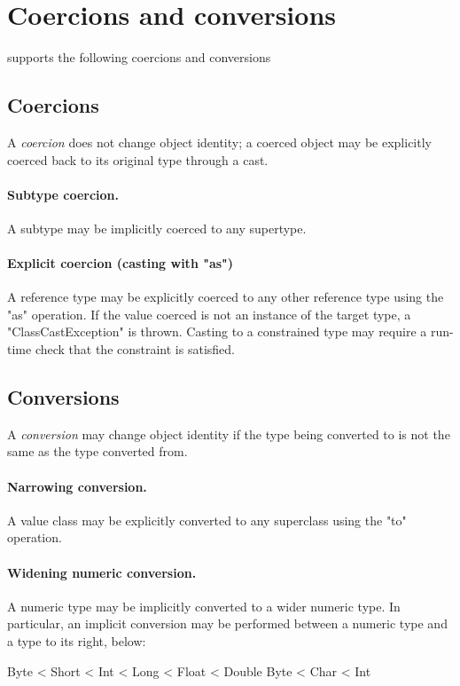 \section{Coercions and conversions}
\label{XtenConversions}\label{XtenPromotions}

\XtenCurrVer{} supports the following coercions and conversions

\subsection{Coercions}

A {\em coercion} does not change object identity;
a coerced object may be explicitly coerced back to its original
type through a cast.

\paragraph{Subtype coercion.}
A subtype may be implicitly coerced to any supertype.

\paragraph{Explicit coercion (casting with \xcd"as")}
A reference type may be explicitly coerced to any other
reference type using the \xcd"as" operation.
If the value coerced is not an instance of the target type,
a \xcd"ClassCastException" is thrown.  Casting to a constrained
type may require a run-time check that the constraint is
satisfied.

\subsection{Conversions}

A {\em conversion} may change object identity if the type being
converted to is not the same as the type converted from.

\paragraph{Narrowing conversion.}
A value class may be explicitly converted to any superclass
using the \xcd"to" operation.


\paragraph{Widening numeric conversion.}
A numeric type may be implicitly converted to a wider
numeric type.
In particular, an implicit conversion may be performed between
a numeric type and a type to its right, below:
\begin{xten}
Byte < Short < Int < Long < Float < Double
Byte < Char < Int
\end{xten}

